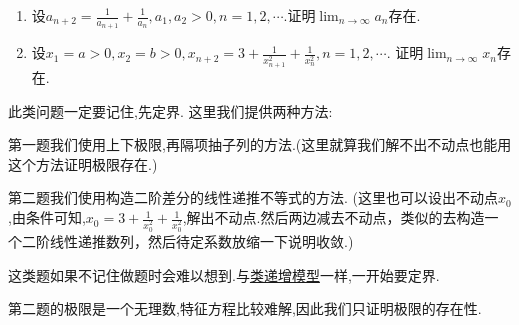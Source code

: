 \documentclass[lang=cn,newtx,10pt,scheme=chinese]{elegantbook}
\begin{document}
\begin{example}[类递减模型]\label{example:类递减模型}
\begin{enumerate}
\item 设\(a_{n + 2} = \frac{1}{a_{n + 1}} + \frac{1}{a_{n}}, a_{1}, a_{2} > 0, n = 1,2,\cdots\).证明\(\lim_{n \to \infty} a_{n}\)存在.

\item 设\(x_{1} = a>0, x_{2} = b>0, x_{n + 2} = 3 + \frac{1}{x_{n + 1}^{2}} + \frac{1}{x_{n}^{2}}, n = 1,2,\cdots\).
证明\(\lim_{n \to \infty} x_{n}\)存在.
\end{enumerate}   
\end{example}
\begin{note}
此类问题一定要记住,先定界.
这里我们提供两种方法:

第一题我们使用上下极限,再隔项抽子列的方法.(这里就算我们解不出不动点也能用这个方法证明极限存在.)

第二题我们使用构造二阶差分的线性递推不等式的方法.
(这里也可以设出不动点$x_0$,由条件可知,$x_0=3+\frac{1}{x_0^2}+\frac{1}{x_0^2}$,解出不动点.然后两边减去不动点，类似的去构造一个二阶线性递推数列，然后待定系数放缩一下说明收敛.)

这类题如果不记住做题时会难以想到.与\hyperref[example:类递增模型]{类递增模型}一样,一开始要定界.
\end{note}
\begin{remark}
第二题的极限是一个无理数,特征方程比较难解,因此我们只证明极限的存在性.
\end{remark}
\end{document}
